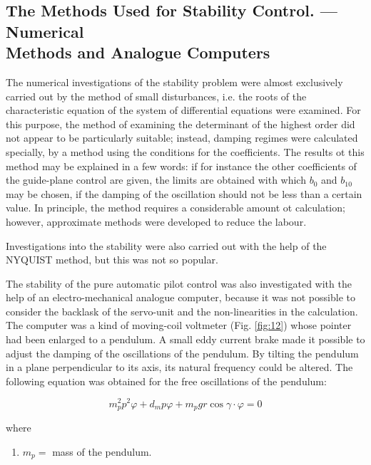 \documentclass[12pt, a4paper]{article}
\begin{document}
\subsection[The Methods Used for Stability Control. — Numerical Methods and Analogue Computers]{The Methods Used for Stability Control. — Numerical\\Methods and Analogue Computers}

The numerical investigations of the stability problem were almost exclusively carried out by the method of small disturbances, i.e. the roots of the characteristic equation of the system of differential equations were examined. For this purpose, the method of examining the determinant of the highest order did not appear to be particularly suitable; instead, damping regimes were calculated specially, by a method using the conditions for the coefficients. The results ot this method may be explained in a few words: if for instance the other coefficients of the guide-plane control are given, the limits are obtained with which $b_{0}$ and $b_{10}$ may be chosen, if the damping of the oscillation should not be less than a certain value. In principle, the method requires a considerable amount ot calculation; however, approximate methods were developed to reduce the labour.

Investigations into the stability were also carried out with the help of the NYQUIST method, but this was not so popular.

The stability of the pure automatic pilot control was also investigated with the help of an electro-mechanical analogue computer, because it was not possible to consider the backlask of the servo-unit and the non-linearities in the calculation. The computer was a kind of moving-coil voltmeter (Fig. \ref{fig:12}) whose pointer had been enlarged to a pendulum. A small eddy current brake made it possible to adjust the damping of the oscillations of the pendulum. By tilting the pendulum in a plane perpendicular to its axis, its natural frequency could be altered. The following equation was obtained for the free oscillations of the pendulum:

\begin{equation}
  m_{p}^{2}p^{2}\varphi+d_{m}p\varphi+m_{p}gr\cos{\gamma}\cdot{\varphi}=0
\end{equation}

where
\begin{enumerate}[label={}]
  \item $m_{p} =$ mass of the pendulum.
\end{enumerate}
\end{document}
